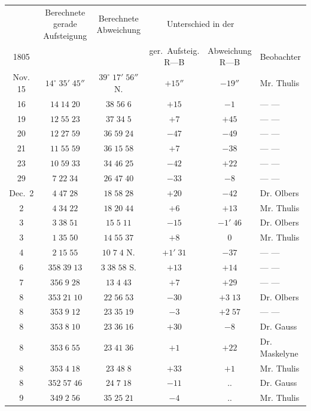 \begin{center}\begingroup
\fontsize{9}{11}\selectfont
\setlength{\tabcolsep}{2pt}\renewcommand{\arraystretch}{1.12}
\begin{tabular}{c|cc|cc|l}
& \shortstack{Berechnete gerade\\Aufsteigung} & \shortstack{Berechnete\\Abweichung} & \multicolumn{2}{c|}{Unterschied in der} & \\
1805 & & & \shortstack{ger.\ Aufsteig.\\R---B} & \shortstack{Abweichung\\R---B} & Beobachter \\
\hline
Nov. 15 & $14^\circ\;35'\;45''$ & $39^\circ\;17'\;56''$ N. & $+15''$ & $-19''$ & Mr. Thulis \\
16 & $14\;14\;20$ & $38\;56\;6$ & $+15$ & $-1$ & --- --- \\
19 & $12\;55\;23$ & $37\;34\;5$ & $+7$ & $+45$ & --- --- \\
20 & $12\;27\;59$ & $36\;59\;24$ & $-47$ & $-49$ & --- --- \\
21 & $11\;55\;59$ & $36\;15\;58$ & $+7$ & $-38$ & --- --- \\
23 & $10\;59\;33$ & $34\;46\;25$ & $-42$ & $+22$ & --- --- \\
29 & $7\;22\;34$ & $26\;47\;40$ & $-33$ & $-8$ & --- --- \\
Dec.\ 2 & $4\;47\;28$ & $18\;58\;28$ & $+20$ & $-42$ & Dr. Olbers \\
2 & $4\;34\;22$ & $18\;20\;44$ & $+6$ & $+13$ & Mr. Thulis \\
3 & $3\;38\;51$ & $15\;5\;11$ & $-15$ & $-1'\;46$ & Dr. Olbers \\
3 & $1\;35\;50$ & $14\;55\;37$ & $+8$ & $0$ & Mr. Thulis \\
4 & $2\;15\;55$ & $10\;7\;4$ N. & $+1'\;31$ & $-37$ & --- --- \\
6 & $358\;39\;13$ & $3\;38\;58$ S. & $+13$ & $+14$ & --- --- \\
7 & $356\;9\;28$ & $13\;4\;43$ & $+7$ & $+29$ & --- --- \\
8 & $353\;21\;10$ & $22\;56\;53$ & $-30$ & $+3\;13$ & Dr. Olbers \\
8 & $353\;9\;12$ & $23\;35\;19$ & $-3$ & $+2\;57$ & --- --- \\
8 & $353\;8\;10$ & $23\;36\;16$ & $+30$ & $-8$ & Dr. Gauss \\
8 & $353\;6\;55$ & $23\;41\;36$ & $+1$ & $+22$ & Dr. Maskelyne \\
8 & $353\;4\;18$ & $23\;48\;8$ & $+33$ & $+1$ & Mr. Thulis \\
8 & $352\;57\;46$ & $24\;7\;18$ & $-11$ & .\quad . & Dr. Gauss \\
9 & $349\;2\;56$ & $35\;25\;21$ & $-4$ & .\quad . & Mr. Thulis \\
\end{tabular}\endgroup\end{center}
